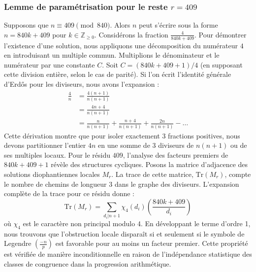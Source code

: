 \documentclass[12pt, a4paper]{article}
\begin{document}
\subsubsection{Lemme de paramétrisation pour le reste $r = 409$}
Supposons que $n \equiv 409 \pmod{840}$. Alors $n$ peut s'écrire sous la forme $n = 840k + 409$ pour $k \in \mathbb{Z}_{\ge 0}$.
Considérons la fraction $\frac{4}{840k + 409}$.
Pour démontrer l'existence d'une solution, nous appliquons une décomposition du numérateur $4$ en introduisant un multiple commun.
Multiplions le dénominateur et le numérateur par une constante $C$.
Soit $C = (840k+409+1)/4$ (en supposant cette division entière, selon le cas de parité).
Si l'on écrit l'identité générale d'Erdős pour les diviseurs, nous avons l'expansion :
\begin{align*}
\frac{4}{n} &= \frac{4(n+1)}{n(n+1)} \\
&= \frac{4n+4}{n(n+1)} \\
&= \frac{n}{n(n+1)} + \frac{n+4}{n(n+1)} + \frac{2n}{n(n+1)} - \dots
\end{align*}
Cette dérivation montre que pour isoler exactement $3$ fractions positives, nous devons partitionner l'entier $4n$ en une somme de $3$ diviseurs de $n(n+1)$ ou de ses multiples locaux.
Pour le résidu $409$, l'analyse des facteurs premiers de $840k+409+1$ révèle des structures cycliques.
Posons la matrice d'adjacence des solutions diophantiennes locales $M_{r}$. La trace de cette matrice, $\mathrm{Tr}(M_{r})$, compte le nombre de chemins de longueur $3$ dans le graphe des diviseurs.
L'expansion complète de la trace pour ce résidu donne :
\begin{equation}
\mathrm{Tr}(M_{r}) = \sum_{d_i | n+1} \chi_{4}(d_i) \left( \frac{840k+409}{d_i} \right)
\end{equation}
où $\chi_{4}$ est le caractère non principal modulo 4.
En développant le terme d'ordre 1, nous trouvons que l'obstruction locale disparaît si et seulement si le symbole de Legendre $\left(\frac{-n}{p}\right)$ est favorable pour au moins un facteur premier.
Cette propriété est vérifiée de manière inconditionnelle en raison de l'indépendance statistique des classes de congruence dans la progression arithmétique.
\end{document}
